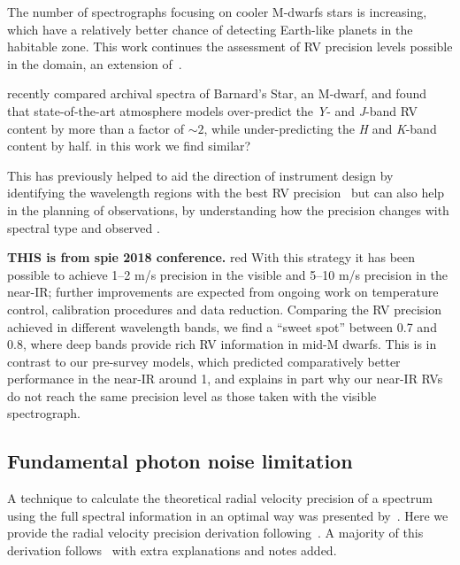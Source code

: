 
The number of \nir{} spectrographs focusing on cooler {M-dwarfs} stars is increasing, which have a relatively better chance of detecting Earth-like planets in the habitable zone.
This work continues the assessment of {RV} precision levels possible in the \nir{} domain, an extension of~\citep{figueira_radial_2016}.



\citet{artigau_optical_2018} recently compared archival spectra of Barnard's Star, an {M-dwarf}, and found that state-of-the-art atmosphere models over-predict the \emph{Y}- and \emph{J}-band {RV} content by more than a factor of \(\sim2\), while under-predicting the \emph{H} and \emph{K}-band content by half.
{\red{} in this work we find similar?}

This has previously helped to aid the direction of instrument design by identifying the wavelength regions with the best {RV} precision~\citep{figueira_radial_2016} but can also help in the planning of observations, by understanding how the precision changes with spectral type and observed {\snr{}}.


\textbf{THIS is from spie 2018 conference.}
{red{} \citep{quirrenbach_carmenes_2018} With this strategy it has been possible to achieve 1--2 m/s precision in the visible and 5--10 m/s precision in the {near-IR}; further improvements are expected from ongoing work on temperature control, calibration procedures and data reduction. Comparing the RV precision achieved in different wavelength bands, we find a ``sweet spot'' between 0.7 and 0.8\um, where deep  bands provide rich RV information in mid-M dwarfs. This is in contrast to our pre-survey models, which predicted comparatively better performance in the near-IR around 1\um, and explains in part why our near-IR RVs do not reach the same precision level as those taken with the visible spectrograph.}




\subsection{Fundamental photon noise limitation}
\label{subsec:fundamental_precision}
A technique to calculate the theoretical radial velocity precision of a spectrum using the full spectral information in an optimal way was presented by~\citet{connes_absolute_1985}.
Here we provide the radial velocity precision derivation following~\citet{connes_absolute_1985, bouchy_fundamental_2001, figueira_radial_2016}.
A majority of this derivation follows~\citet{bouchy_fundamental_2001} with extra explanations and notes added.

